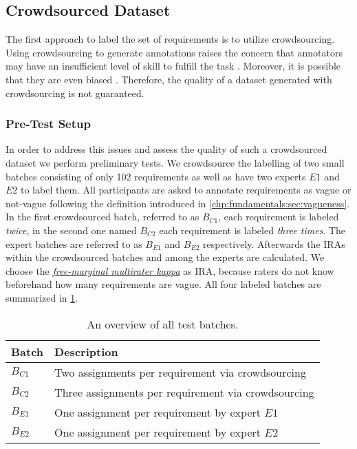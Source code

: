 \subsection{Crowdsourced Dataset}
\label{chp:study:sec:study_objects:crowdsourced_dataset}

The first approach to label the set of requirements is to utilize crowdsourcing.
Using crowdsourcing to generate annotations raises the concern that annotators may have an insufficient level of skill to fulfill the task \parencite{Quinn:2011}.
Moreover, it is possible that they are even biased \parencite{Kittur:2008}.
Therefore, the quality of a dataset generated with crowdsourcing is not guaranteed.

\subsubsection{Pre-Test Setup}
In order to address this issues and assess the quality of such a crowdsourced dataset we perform preliminary tests.
We crowdsource the labelling of two small batches consisting of only 102 requirements as well as have two experts $E1$ and $E2$ to label them.
All participants are asked to annotate requirements as vague or not-vague following the definition introduced in \cref{chp:fundamentals:sec:vagueness}.
In the first crowdsourced batch, referred to as $B_{C1}$, each requirement is labeled \textit{twice}, in the second one named $B_{C2}$ each requirement is labeled \textit{three times}.
The expert batches are referred to as $B_{E1}$ and $B_{E2}$ respectively.
Afterwards the \acp{IRA} within the crowdsourced batches and among the experts are calculated.
We choose the \hyperref[chp:fundamentals:sec:inter_rater_agreement:subsec:free_marginal_multirater_kappa]{\textit{free-marginal multirater kappa}} as \ac{IRA}, because raters do not know beforehand how many requirements are vague.
All four labeled batches are summarized in \cref{tab:study:objects:crowdsourcing:batches}.
\begin{table}[htpb]
    \centering
    \begin{tabular}{l l}
        \toprule
        Batch & Description \\
        \midrule
        $B_{C1}$ & Two assignments per requirement via crowdsourcing\\
        $B_{C2}$ & Three assignments per requirement via crowdsourcing\\
        $B_{E1}$ & One assignment per requirement by expert $E1$ \\
        $B_{E2}$ & One assignment per requirement by expert $E2$ \\
        \bottomrule
    \end{tabular}
    \caption[Overview of test batches]{An overview of all test batches.}\label{tab:study:objects:crowdsourcing:batches}
\end{table}

